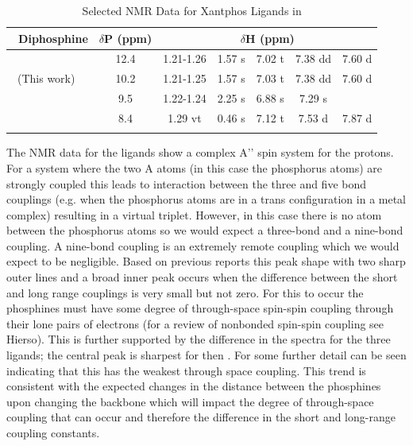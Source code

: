 {\begin{table}[ht]
\small
\caption[Selected NMR Data for Xantphos Ligands]{Selected NMR Data for Xantphos Ligands in }
\vspace{1em}
\label{table:ligandNMRdata}
\begin{center}
\begin{tabular}{l c c c c c c}
	\toprule
	~\bfseries{Diphosphine} & \bfseries{$\delta$P (ppm)} & \multicolumn{5}{c}{\bfseries{$\delta$H (ppm)}} \\
	\midrule		
	~\tBuXantphos\cite{Mispelaere2005}	& 12.4 & 1.21-1.26 & 1.57 s & 7.02 t & 7.38 dd & 7.60 d\\
	~\tBuXantphos{}(This work) 		& 10.2 & 1.21-1.25 & 1.57 s & 7.03 t & 7.38 dd & 7.60 d\\
	~\tBuThixantphos				& 9.5 & 1.22-1.24 & 2.25 s & 6.88 s & 7.29 s & \\
	~\tBuSixantphos				& 8.4 & 1.29 vt & 0.46 s & 7.12 t & 7.53 d & 7.87 d\\ 
	\bottomrule{}
\end{tabular}
\end{center}
\end{table}

The \proton{} NMR data for the \tBuxantphos{} ligands show a complex A'' spin system for the \tBu{} protons.  For a system where the two A atoms (in this case the phosphorus atoms) are strongly coupled this leads to interaction between the three and five bond couplings (e.g. when the phosphorus atoms are in a trans configuration in a metal complex) resulting in a virtual triplet.  However, in this case there is no atom between the phosphorus atoms so we would expect a three-bond and a nine-bond coupling.  A nine-bond coupling is an extremely remote coupling which we would expect to be negligible.  Based on previous reports\cite{Harris1964, Abraham1961} this peak shape with two sharp outer lines and a broad inner peak occurs when the difference between the short and long range couplings is very small but not zero.  For this to occur the phosphines must have some degree of through-space spin-spin coupling through their lone pairs of electrons (for a review of nonbonded spin-spin coupling see Hierso\cite{Hierso2014}).  This is further supported by the difference in the \proton{} spectra for the three ligands; the central peak is sharpest for \tBusixantphos{} then \tButhixantphos{}.  For \tBuxantphos{} some further detail can be seen indicating that this has the weakest through space coupling.  This trend is consistent with the expected changes in the distance between the phosphines upon changing the backbone which will impact the degree of through-space coupling that can occur and therefore the difference in the short and long-range coupling constants.

}
